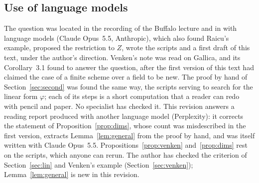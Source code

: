 \documentclass[11pt,a4paper]{amsart}
\theoremstyle{remark}
\begin{document}
\subsection*{Use of language models}
The question was located in the recording of the Buffalo lecture and in \cite{fga3} with language models (Claude Opus~5.5, Anthropic), which also found Raicu's example, proposed the restriction to $Z$, wrote the scripts and a first draft of this text, under the author's direction. Venken's note was read on Gallica, and its Corollary~3.1 found to answer the question, after the first version of this text had claimed the case of a finite scheme over a field to be new. The proof by hand of Section~\ref{sec:second} was found the same way, the scripts serving to search for the linear form $\varphi$; each of its steps is a short computation that a reader can redo with pencil and paper. No specialist has checked it. This revision answers a reading report produced with another language model (Perplexity): it corrects the statement of Proposition~\ref{prop:dims}, whose count was misdescribed in the first version, extracts Lemma~\ref{lem:general} from the proof by hand, and was itself written with Claude Opus~5.5. Propositions~\ref{prop:venken} and~\ref{prop:dims} rest on the scripts, which anyone can rerun. The author has checked the criterion of Section~\ref{sec:lin} and Venken's example (Section~\ref{sec:venken}); Lemma~\ref{lem:general} is new in this revision.
\end{document}
